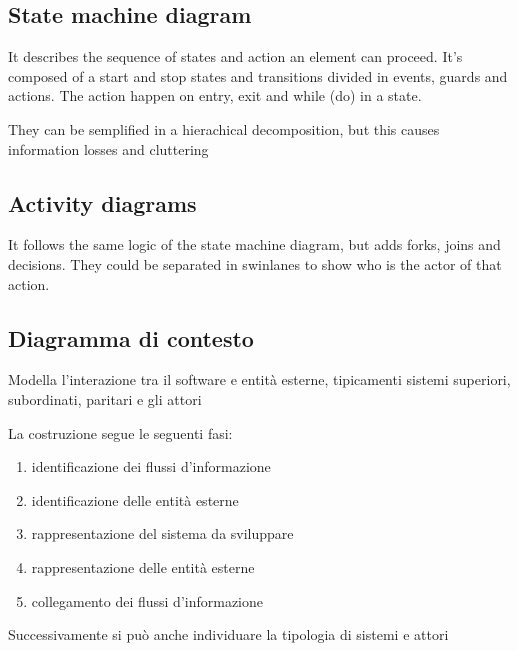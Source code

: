 \documentclass[12pt, a4paper]{article}
\begin{document}
\subsection{State machine diagram}
It describes the sequence of states and action an element can proceed. It's composed of a start and stop states and
transitions divided in events, guards and actions. The action happen on entry, exit and while (do) in a state.

They can be semplified in a hierachical decomposition, but this causes information losses and cluttering

\subsection{Activity diagrams}
It follows the same logic of the state machine diagram, but adds forks, joins and decisions. They could be
separated in swinlanes to show who is the actor of that action.

\subsection{Diagramma di contesto}
Modella l'interazione tra il software e entità esterne, tipicamenti sistemi superiori, subordinati, paritari e
gli attori

La costruzione segue le seguenti fasi:
\begin{enumerate}
    \item identificazione dei flussi d'informazione
    \item identificazione delle entità esterne
    \item rappresentazione del sistema da sviluppare
    \item rappresentazione delle entità esterne
    \item collegamento dei flussi d'informazione
\end{enumerate}
Successivamente si può anche individuare la tipologia di sistemi e attori
\end{document}
